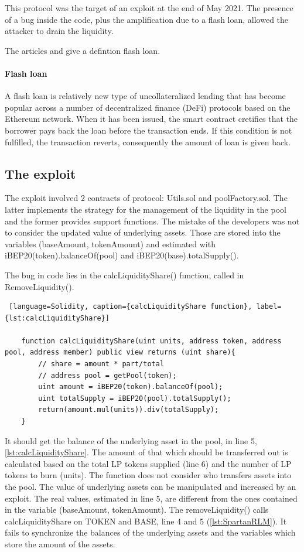 This protocol was the target of an exploit at the end of May 2021.
The presence of a bug inside the code, plus the amplification due to a flash loan, allowed the attacker to drain the liquidity.

The articles  and  give a defintion flash loan.

\paragraph{Flash loan} A flash loan is relatively new type of uncollateralized lending that has become popular across a 
number of decentralized finance (DeFi) protocols based on the Ethereum network. 
When it has been issued, the smart contract cretifies that the borrower pays back the loan before the transaction ends. 
If this condition is not fulfilled, the transaction reverts, consequently the amount of loan is given back. 


\subsection{The exploit}
\label{sec:Spartan:Exploit}
The exploit involved 2 contracts of protocol: Utils.sol and poolFactory.sol.
The latter implements the strategy for the management of the liquidity in the pool and the former provides support functions. 
The mistake of the developers was not to consider the updated value of underlying assets. 
Those are stored into the variables (baseAmount, tokenAmount) and estimated with iBEP20(token).balanceOf(pool) and iBEP20(base).totalSupply().

The bug in code lies in the calcLiquidityShare() function, called in RemoveLiquidity(). 
\begin{lstlisting} [language=Solidity, caption={calcLiquidityShare function}, label={lst:calcLiquidityShare}]

    function calcLiquidityShare(uint units, address token, address pool, address member) public view returns (uint share){
        // share = amount * part/total
        // address pool = getPool(token);
        uint amount = iBEP20(token).balanceOf(pool);
        uint totalSupply = iBEP20(pool).totalSupply();
        return(amount.mul(units)).div(totalSupply);
    }

\end{lstlisting}

It should get the balance of the underlying asset in the pool, in line 5, \autoref{lst:calcLiquidityShare}. 
The amount of that which should be transferred out is calculated based on the total LP tokens supplied (line 6) 
and the number of LP tokens to burn (units).
The function does not consider who transfers assets into the pool. The value of underlying assets can be manipulated and increased by an exploit. 
The real values, estimated in line 5, are different from the ones contained in the variable (baseAmount, tokenAmount).
The removeLiquidity() calls calcLiquidityShare on TOKEN and BASE, line 4 and 5 (\autoref{lst:SpartanRLM}). 
It fails to synchronize the balances of the underlying assets and the variables which store the amount of the assets.

